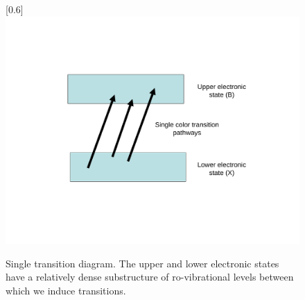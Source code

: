 \begin{figure}
\scalebox{0.6}[0.6]{
\includegraphics[bb=35 125 489 450]
{pathways_single/pathways_single.pdf}
}
\caption[Single transition diagram]{Single transition diagram. The upper and lower electronic states have a relatively dense substructure of ro-vibrational levels between which we induce transitions.}
\label{pathways_single}
\end{figure}
